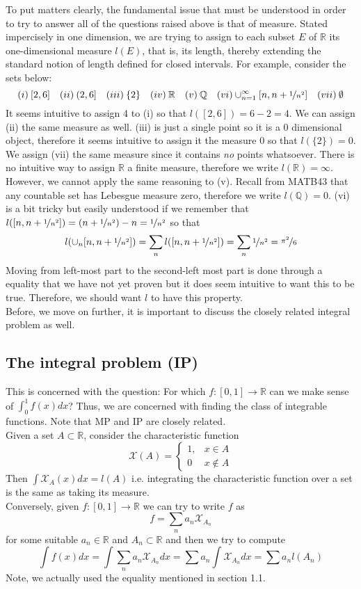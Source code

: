 \documentclass[a4paper, 11pt]{book}
\theoremstyle{definition}
\theoremstyle{remark}
\begin{document}
    To put matters clearly, the fundamental issue that must be understood in order to try to answer all of the questions raised above
    is that of measure. Stated impercisely in one dimension, we are trying to assign to each subset $E$ of $\mathbb{R}$ its 
    one-dimensional measure $l(E)$, that is, its length, thereby extending the standard notion of length defined for closed intervals.
    For example, consider the sets below:
    \[ (i)\: [2,6] \quad (ii)\: (2,6] \quad (iii)\: \{2\} \quad (iv)\: \mathbb{R} \quad (v)\: \mathbb{Q} \quad (vi) 
        \cup_{n=1}^{\infty} [n,n+\nicefrac{1}{n^2}] \quad (vii)\: \emptyset\]
    It seems intuitive to assign 4 to (i) so that $l([2,6]) = 6 - 2 = 4$. We can assign (ii) the same measure as well. (iii) is just
    a single point so it is a 0 dimensional object, therefore it seems intuitive to assign it the measure 0 so that $l(\{2\}) = 0$.
    We assign (vii) the same measure since it contains \textit{no} points whatsoever. There is no intuitive way to assign
    $\mathbb{R}$ a finite measure, therefore we write $l(\mathbb{R}) = \infty$. However, we cannot apply the same reasoning to (v).
    Recall from MATB43 that any countable set has Lebesgue measure zero, therefore we write $l(\mathbb{Q}) = 0$. (vi) is a bit tricky
    but easily understood if we remember that $l([n,n+\nicefrac{1}{n^2}]) = (n+\nicefrac{1}{n^2}) - n = \nicefrac{1}{n^2}$ so that
    \[ l(\cup_{n} [n,n+\nicefrac{1}{n^2}]) = \sum_n l([n,n+\nicefrac{1}{n^2}]) = \sum_n \nicefrac{1}{n^2} = \nicefrac{\pi^2}{6} \]
    Moving from left-most part to the second-left most part is done through a equality that we have not yet proven but it does
    seem intuitive to want this to be true. Therefore, we should want $l$ to have this property.\\
    Before, we move on further, it is important to discuss the closely related integral problem as well.

    \subsection{The integral problem (IP)}
    This is concerned with the question: For which $f: [0,1]\to\mathbb{R}$ can we make sense of $\int_0^1 f(x)dx$? Thus, we are
    concerned with finding the class of integrable functions. Note that MP and IP are closely related.\\
    Given a set $A\subset\mathbb{R}$, consider the characteristic function
    \[ \mathcal{X}(A) = \begin{cases} 
            1, & x\in A \\
            0  & x\not\in A
       \end{cases} \]
   Then $\int \mathcal{X}_A(x)dx = l(A)$ i.e. integrating the characteristic function over a set is the same as taking its measure.\\
   Conversely, given $f:[0,1]\to\mathbb{R}$ we can try to write $f$ as 
   \[ f = \sum_n a_n\mathcal{X}_{A_n} \]
   for some suitable $a_n\in\mathbb{R}$ and $A_n\subset\mathbb{R}$ and then we try to compute
   \[ \int f(x)dx = \int \sum_n a_n\mathcal{X}_{A_n}dx = \sum a_n\int \mathcal{X}_{A_n}dx = \sum a_nl(A_n) \]
   Note, we actually used the equality mentioned in section 1.1.
\end{document}
